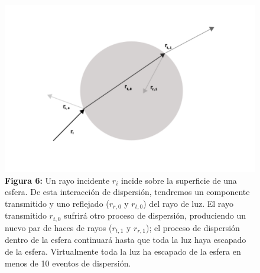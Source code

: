 \documentclass[10pt,aspectratio=1610,compress,dvipsnames]{beamer}
\begin{document}
\begin{frame}
{\begin{figure}
    \centering
    \includegraphics[scale=0.16]{beadrayoptics2.png}
    \captionsetup{labelformat=empty}
    \caption{\textbf{Figura 6:} Un rayo incidente $r_i$ incide sobre la superficie de una esfera. De esta interacción de dispersión, tendremos un componente transmitido y uno reflejado ($r_{r,0}$ y $r_{t,0}$) del rayo de luz. El rayo transmitido $r_{t,0}$ sufrirá otro proceso de dispersión, produciendo un nuevo par de haces de rayos ($r_{t,1}$ y $r_{r,1}$); el proceso de dispersión dentro de la esfera continuará hasta que toda la luz haya escapado de la esfera. Virtualmente toda la luz ha escapado de la esfera en menos de 10 eventos de dispersión.}
    \label{bead_optics}
\end{figure}
}



\end{frame}
\end{document}
